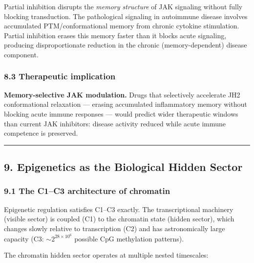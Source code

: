 \documentclass[
  11pt,
]{article}
\begin{document}
Partial inhibition disrupts the \emph{memory structure} of JAK signaling
without fully blocking transduction. The pathological signaling in
autoimmune disease involves accumulated PTM/conformational memory from
chronic cytokine stimulation. Partial inhibition erases this memory
faster than it blocks acute signaling, producing disproportionate
reduction in the chronic (memory-dependent) disease component.

\hypertarget{therapeutic-implication-3}{%
\subsubsection{8.3 Therapeutic
implication}\label{therapeutic-implication-3}}

\textbf{Memory-selective JAK modulation.} Drugs that selectively
accelerate JH2 conformational relaxation --- erasing accumulated
inflammatory memory without blocking acute immune responses --- would
predict wider therapeutic windows than current JAK inhibitors: disease
activity reduced while acute immune competence is preserved.

\begin{center}\rule{0.5\linewidth}{0.5pt}\end{center}

\hypertarget{epigenetics-as-the-biological-hidden-sector}{%
\subsection{9. Epigenetics as the Biological Hidden
Sector}\label{epigenetics-as-the-biological-hidden-sector}}

\hypertarget{the-c1c3-architecture-of-chromatin}{%
\subsubsection{9.1 The C1--C3 architecture of
chromatin}\label{the-c1c3-architecture-of-chromatin}}

Epigenetic regulation satisfies C1--C3 exactly. The transcriptional
machinery (visible sector) is coupled (C1) to the chromatin state
(hidden sector), which changes slowly relative to transcription (C2) and
has astronomically large capacity (C3: \(\sim 2^{28 \times 10^6}\)
possible CpG methylation patterns).

The chromatin hidden sector operates at multiple nested timescales:
\end{document}
